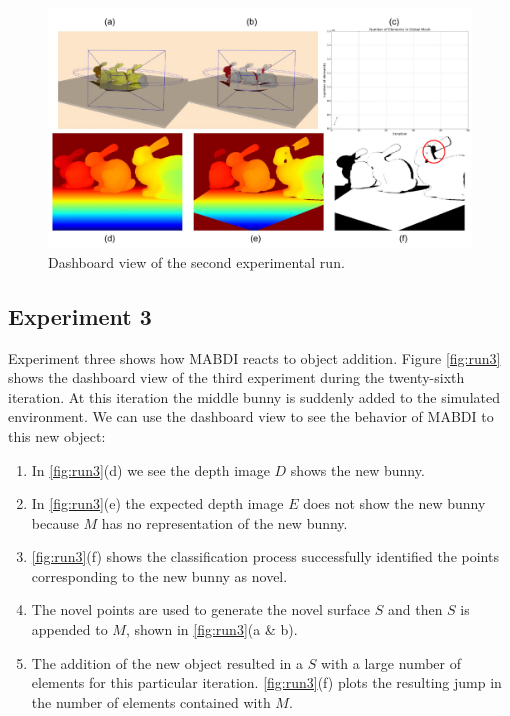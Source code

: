 \begin{figure}[h]%
\centering
  \includegraphics[width=\textwidth]{figures/results_run2.pdf}
  \caption{Dashboard view of the second experimental run.}
  \label{fig:run2}
\end{figure}

\subsection{Experiment 3}

Experiment three shows how MABDI reacts to object addition. Figure
\ref{fig:run3} shows the dashboard view of the third experiment during the
twenty-sixth iteration. At this iteration the middle bunny is suddenly added to
the simulated environment. We can use the dashboard view to see the behavior of
MABDI to this new object:
\begin{enumerate}
  \item In \ref{fig:run3}(d) we see the depth image $D$ shows the new bunny.
  \item In \ref{fig:run3}(e) the expected depth image $E$ does not show the new
  bunny because $M$ has no representation of the new bunny.
  \item \ref{fig:run3}(f) shows the classification process successfully
  identified the points corresponding to the new bunny as novel.
  \item The novel points are used to generate the novel surface $S$ and then $S$
  is appended to $M$, shown in \ref{fig:run3}(a \& b).
  \item The addition of the new object resulted in a $S$ with a large number of
  elements for this particular iteration. \ref{fig:run3}(f) plots the resulting
  jump in the number of elements contained with $M$.
\end{enumerate}

